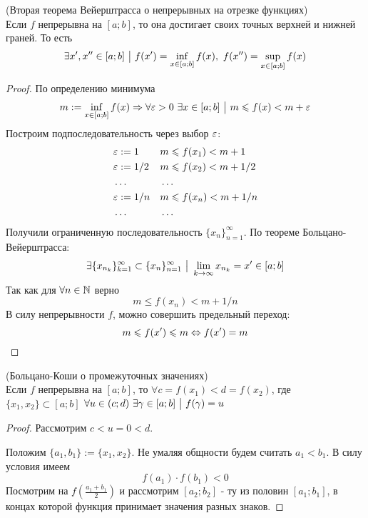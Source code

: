 \begin{theorem} (Вторая теорема Вейерштрасса о непрерывных на отрезке функциях) \\
	Если $f$ непрерывна на $[a; b]$, то она достигает своих точных верхней и нижней граней. То есть
	$$
		\exists x', x'' \in [a; b] \ \big|\  f(x') = \inf\limits_{x \in [a; b]} f(x),\ f(x'') = \sup\limits_{x \in [a; b]} f(x)
	$$
\end{theorem}

\begin{proof}
	По определению минимума
	$$
		m := \inf\limits_{x \in [a; b]} f(x) \Rightarrow \forall \varepsilon > 0\ \exists x \in [a; b] \ \big|\  m \leqslant f(x) < m + \varepsilon
	$$
	Построим подпоследовательность через выбор $\varepsilon$:
	\begin{align*}
		&\varepsilon := 1 & &m \leqslant f(x_1) < m + 1
		\\
		&\varepsilon := 1/2 & &m \leqslant f(x_2) < m + 1/2
		\\
		&\dots & &\dots
		\\
		&\varepsilon := 1/n & &m \leqslant f(x_n) < m + 1/n
		\\
		&\dots & &\dots
	\end{align*}
	Получили ограниченную последовательность $\{x_n\}_{n = 1}^\infty$. По теореме Больцано-Вейерштрасса:
	$$
		\exists \{x_{n_k}\}_{k = 1}^\infty \subset \{x_n\}_{n = 1}^\infty \ \big|\  \lim\limits_{k \to \infty} x_{n_k} = x' \in [a; b] 
	$$
	Так как для $\forall n \in \mathbb{N}$ верно
	$$
		m \le f(x_n) < m + 1/n
	$$
	В силу непрерывности $f$, можно совершить предельный переход:
	$$
		m \leqslant f(x') \leqslant m \Leftrightarrow f(x') = m
	$$
\end{proof}

\begin{theorem} (Больцано-Коши о промежуточных значениях) \\
	Если $f$ непрерывна на $[a; b]$, то $\forall c = f(x_1) < d = f(x_2)$, где $\{x_1, x_2\} \subset [a; b]$ $\forall u \in (c; d)\ \exists \gamma \in [a; b] \ \big|\  f(\gamma) = u$
\end{theorem}

\begin{proof}
	Рассмотрим $c < u = 0 < d$.
	
	Положим $\{a_1, b_1\} := \{x_1, x_2\}$. Не умаляя общности будем считать $a_1 < b_1$. В силу условия имеем
	$$
		f(a_1) \cdot f(b_1) < 0
	$$
	Посмотрим на $f(\frac{a_1 + b_1}{2})$ и рассмотрим $[a_2; b_2]$ - ту из половин $[a_1; b_1]$, в концах которой функция принимает значения разных знаков.
	
\end{proof}

